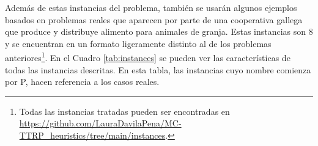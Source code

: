 Además de estas instancias del problema, también se usarán algunos ejemplos basados en problemas reales que aparecen por parte de una cooperativa gallega que produce y distribuye alimento para animales de granja. Estas instancias son 8 y se encuentran en un formato ligeramente distinto al de los problemas anteriores\footnote{Todas las instancias tratadas pueden ser encontradas en \url{https://github.com/LauraDavilaPena/MC-TTRP_heuristics/tree/main/instances}.}. En el Cuadro \ref{tab:instances} se pueden ver las características de todas las instancias descritas. En esta tabla, las instancias cuyo nombre comienza por P, hacen referencia a los casos reales.\\
\renewcommand{\arraystretch}{0.8}
\begin{table}[!b]
    \centering
    \caption{Características de las instancias de prueba del MC-TTRP.}
\end{table}
